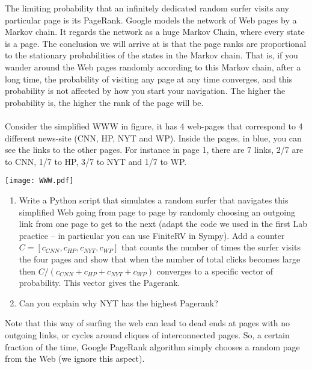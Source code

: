 \documentclass[a4paper,10pt]{article}
\begin{document}
The limiting probability that an infinitely dedicated random surfer visits any
particular page is its PageRank. Google models the network of Web pages by a Markov chain.
It regards the network as a huge Markov Chain, where every state is a page.
The conclusion we will arrive at is that the page ranks are proportional to the
stationary probabilities of the states in the Markov chain.
That is, if you wander around the Web pages randomly according to this Markov
chain, after a long time, the probability of visiting any page at any time
converges, and this probability is not affected by how you start your navigation.
The higher the probability is, the higher the rank of the page will be.\\
~\\
Consider the simplified WWW in figure, it has 4 web-pages that correspond to 4 different news-site (CNN, HP, NYT and WP). Inside the pages, in blue, you can see the links to the other pages. For instance in page 1, there are 7 links, 2/7 are to CNN, 1/7 to HP, 3/7 to NYT and 1/7 to WP.
\begin{center}
\texttt{[image: WWW.pdf]}
\end{center}


\begin{enumerate}
 \item Write a Python script that simulates a random surfer that navigates this simplified Web going from page to page by randomly choosing an
outgoing link from one page to get to the next (adapt the code we used in the first Lab practice -- in particular you can use FiniteRV in Sympy). Add a counter $C=[c_{CNN},c_{HP},c_{NYT},c_{WP}]$ that counts the number of times the surfer visits the four pages and show that when the number of total clicks becomes large then  $C/(c_{CNN}+c_{HP}+c_{NYT}+c_{WP})$ converges to a specific vector of probability. This vector gives the Pagerank.
\item Can you explain why NYT has the highest Pagerank?
\end{enumerate}
Note that this way of surfing the web can lead to dead ends at pages with no outgoing links, or cycles around cliques of interconnected pages.
So, a certain fraction of the time, Google PageRank algorithm simply chooses a random page from the Web (we ignore this aspect).
\end{document}
